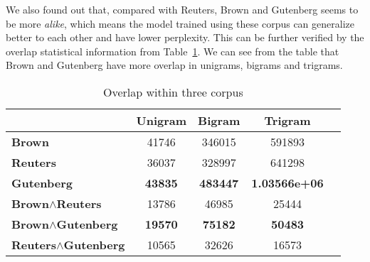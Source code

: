 We also found out that, compared with Reuters, Brown and Gutenberg seems to be more \textit{alike}, which means the model trained using these corpus can generalize better to each other and have lower perplexity. This can be further verified by the overlap statistical information from Table~\ref{tab:overlap}. We can see from the table that Brown and Gutenberg have more overlap in unigrams, bigrams and trigrams.

\begin{table}[ht]  %
\centering  %
\caption{Overlap within three corpus}
\begin{tabular}{lcccc}
\hline
           &   \textbf{Unigram} &   \textbf{Bigram} &   \textbf{Trigram} \\
\hline
 \textbf{Brown}     & 41746 &  346015  &    591893  \\
 \textbf{Reuters}     & 36037 &  328997  &    641298  \\
 \textbf{Gutenberg}     & \textbf{43835} &  \textbf{483447}  &    \textbf{1.03566e+06}  \\
\hline
 \textbf{Brown$\wedge$Reuters}     & 13786 &  46985  &    25444  \\
 \textbf{Brown$\wedge$Gutenberg}     & \textbf{19570} &  \textbf{75182}  &    \textbf{50483}  \\
 \textbf{Reuters$\wedge$Gutenberg}   & 10565 &  32626 &   16573   \\
\hline
\end{tabular}
\label{tab:overlap}
\end{table}